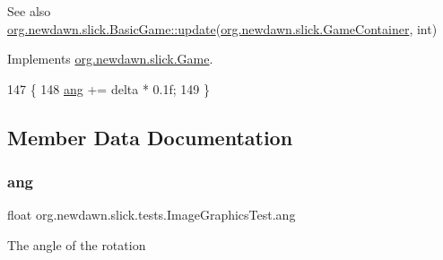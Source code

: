 \begin{DoxySeeAlso}{See also}
\mbox{\hyperlink{classorg_1_1newdawn_1_1slick_1_1_basic_game_acfe6fa05aef83bff1631af91a3e4bd20}{org.\+newdawn.\+slick.\+Basic\+Game\+::update}}(\mbox{\hyperlink{classorg_1_1newdawn_1_1slick_1_1_game_container}{org.\+newdawn.\+slick.\+Game\+Container}}, int) 
\end{DoxySeeAlso}


Implements \mbox{\hyperlink{interfaceorg_1_1newdawn_1_1slick_1_1_game_ab07b2e9463ee4631620dde0de25bdee8}{org.\+newdawn.\+slick.\+Game}}.


\begin{DoxyCode}
147                                                            \{
148         \mbox{\hyperlink{classorg_1_1newdawn_1_1slick_1_1tests_1_1_image_graphics_test_a79ae7333596817e631221f89db724a9c}{ang}} += delta * 0.1f;
149     \}
\end{DoxyCode}


\subsection{Member Data Documentation}
\mbox{\label{classorg_1_1newdawn_1_1slick_1_1tests_1_1_image_graphics_test_a79ae7333596817e631221f89db724a9c}} 
\subsubsection{\texorpdfstring{ang}{ang}}
{\footnotesize\ttfamily float org.\+newdawn.\+slick.\+tests.\+Image\+Graphics\+Test.\+ang\hspace{0.3cm}{\ttfamily [private]}}

The angle of the rotation \mbox{\label{classorg_1_1newdawn_1_1slick_1_1tests_1_1_image_graphics_test_a2fa20a20e1c0e9f83c27c498e2cb8b23}} 
